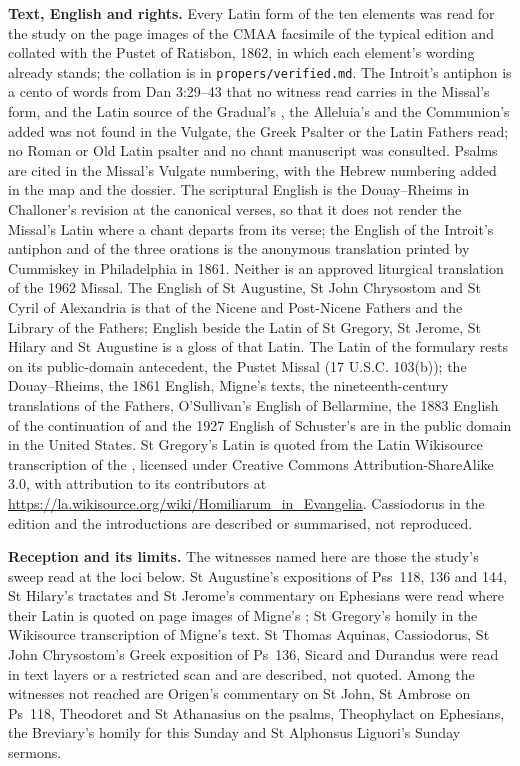 {\textbf{Text, English and rights.} Every Latin form of the ten elements was read
for the study on the page images of the CMAA facsimile of the typical edition
and collated with the Pustet  of Ratisbon, 1862, in which
each element's wording already stands; the collation is in
\texttt{propers/verified.md}. The Introit's antiphon is a cento of words from
Dan 3:29--43 that no witness read carries in the Missal's form, and the Latin
source of the Gradual's , the Alleluia's  and the Communion's added  was not found in the
Vulgate, the Greek Psalter or the Latin Fathers read; no Roman or Old Latin
psalter and no chant manuscript was consulted. Psalms
are cited in the Missal's Vulgate numbering, with the Hebrew numbering added in
the map and the dossier. The scriptural English is the Douay--Rheims in
Challoner's revision at the canonical verses, so that it does not render the
Missal's Latin where a chant departs from its verse; the English of the
Introit's antiphon and of the three orations is the anonymous translation
printed by Cummiskey in Philadelphia in 1861. Neither is an approved liturgical
translation of the 1962 Missal. The English of St Augustine, St John
Chrysostom and St Cyril of Alexandria is that of the Nicene and Post-Nicene
Fathers and the Library of the Fathers; English beside the Latin of St Gregory,
St Jerome, St Hilary and St Augustine is a gloss of that Latin. The Latin of the
formulary rests on its public-domain antecedent, the Pustet Missal (17 U.S.C.
103(b)); the Douay--Rheims, the 1861 English, Migne's texts, the
nineteenth-century translations of the Fathers, O'Sullivan's English of
Bellarmine, the 1883 English of the continuation of 
and the 1927 English of Schuster's  are in the public domain
in the United States. St Gregory's Latin is quoted from the Latin Wikisource
transcription of the , licensed under Creative
Commons Attribution-ShareAlike 3.0, with attribution to its contributors at
\url{https://la.wikisource.org/wiki/Homiliarum_in_Evangelia}. Cassiodorus in
the  edition and the 
introductions are described or summarised, not reproduced.

\textbf{Reception and its limits.} The witnesses named here are those the
study's sweep read at the loci below. St Augustine's expositions of Pss~118,
136 and 144, St Hilary's tractates and St Jerome's commentary on Ephesians were
read where their Latin is quoted on page images of Migne's ; St Gregory's homily in the Wikisource transcription of Migne's text.
St Thomas Aquinas, Cassiodorus, St John Chrysostom's Greek exposition of
Ps~136, Sicard and Durandus were read in text layers or a restricted scan and
are described, not quoted. Among the witnesses not reached are Origen's
commentary on St John, St Ambrose on Ps~118, Theodoret and St Athanasius on the
psalms, Theophylact on Ephesians, the
Breviary's homily for this Sunday and St Alphonsus Liguori's Sunday sermons.

}
